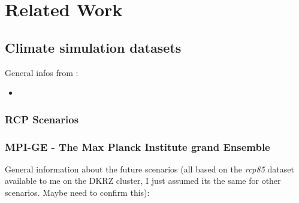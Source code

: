 \chapter{Related Work}

\section{Climate simulation datasets}

General infos from \cite{mpige}:

\begin{itemize}
  \item 
	
\end{itemize}

\subsection{RCP Scenarios}

% 

\subsection{MPI-GE - The Max Planck Institute grand Ensemble}

General information about the future scenarios (all based on the \textit{rcp85} dataset available to me on the DKRZ cluster, I just assumed its the same for other scenarios. Maybe need to confirm this):

